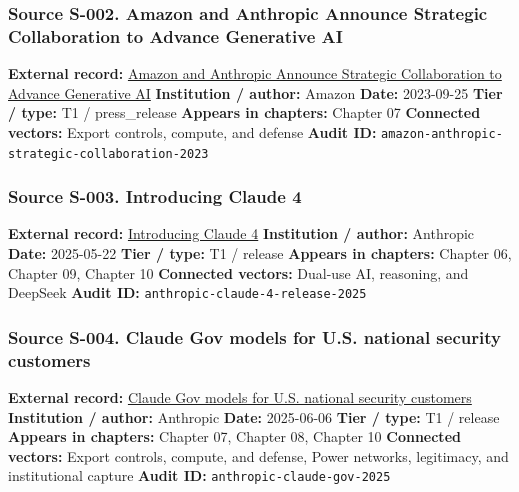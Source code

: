 \documentclass[
  american,
  11pt,
  letterpaper,
]{article}
\begin{document}
\subsubsection{Source S-002. Amazon and Anthropic Announce Strategic
Collaboration to Advance Generative
AI}\label{source-s-002-amazon-and-anthropic-announce-strategic-collaboration-to-advance-generative-ai}

\textbf{External record:}
\href{https://press.aboutamazon.com/2023/9/amazon-and-anthropic-announce-strategic-collaboration-to-advance-generative-ai}{Amazon
and Anthropic Announce Strategic Collaboration to Advance Generative AI}
\textbf{Institution / author:} Amazon \textbf{Date:} 2023-09-25
\textbf{Tier / type:} T1 / press\_release \textbf{Appears in chapters:}
Chapter 07 \textbf{Connected vectors:} Export controls, compute, and
defense \textbf{Audit ID:}
\texttt{amazon-anthropic-strategic-collaboration-2023}

\subsubsection{Source S-003. Introducing Claude
4}\label{source-s-003-introducing-claude-4}

\textbf{External record:}
\href{https://www.anthropic.com/news/claude-4}{Introducing Claude 4}
\textbf{Institution / author:} Anthropic \textbf{Date:} 2025-05-22
\textbf{Tier / type:} T1 / release \textbf{Appears in chapters:} Chapter
06, Chapter 09, Chapter 10 \textbf{Connected vectors:} Dual-use AI,
reasoning, and DeepSeek \textbf{Audit ID:}
\texttt{anthropic-claude-4-release-2025}

\subsubsection{Source S-004. Claude Gov models for U.S. national
security
customers}\label{source-s-004-claude-gov-models-for-u-s-national-security-customers}

\textbf{External record:}
\href{https://www.anthropic.com/news/claude-gov-models-for-u-s-national-security-customers}{Claude
Gov models for U.S. national security customers} \textbf{Institution /
author:} Anthropic \textbf{Date:} 2025-06-06 \textbf{Tier / type:} T1 /
release \textbf{Appears in chapters:} Chapter 07, Chapter 08, Chapter 10
\textbf{Connected vectors:} Export controls, compute, and defense, Power
networks, legitimacy, and institutional capture \textbf{Audit ID:}
\texttt{anthropic-claude-gov-2025}
\end{document}
